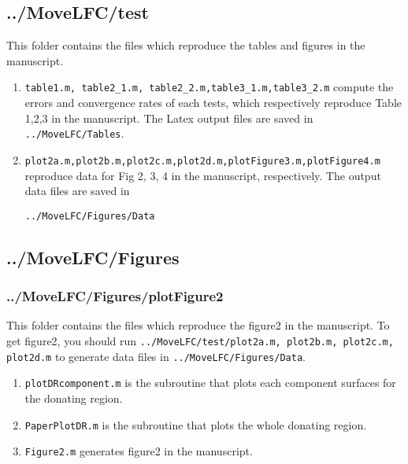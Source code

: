 \documentclass[twoside,a4paper]{article}
\begin{document}
\subsection{../MoveLFC/test}
This folder contains the files which reproduce the tables and figures in the manuscript.

\begin{enumerate}
\item \texttt{table1.m, table2\_1.m, table2\_2.m,table3\_1.m,table3\_2.m} compute the errors and convergence rates of each tests, which respectively reproduce Table 1,2,3 in the manuscript. The Latex output files are saved in \texttt{../MoveLFC/Tables}. 

\item \texttt{plot2a.m,plot2b.m,plot2c.m,plot2d.m,plotFigure3.m,plotFigure4.m}  reproduce data for Fig 2, 3, 4 in the manuscript, respectively. The output data files are saved in 

\texttt{../MoveLFC/Figures/Data}
\end{enumerate}
\subsection{../MoveLFC/Figures}
\subsubsection{../MoveLFC/Figures/plotFigure2}
This folder contains the files which reproduce the figure2 in the manuscript. To get figure2, you should run \texttt{../MoveLFC/test/plot2a.m, plot2b.m, plot2c.m, plot2d.m} to generate data files in \texttt{../MoveLFC/Figures/Data}.
\begin{enumerate}
    \item \texttt{plotDRcomponent.m} is the subroutine that plots each component surfaces for the donating region.
    \item \texttt{PaperPlotDR.m} is the subroutine that plots the whole donating region.
    \item \texttt{Figure2.m} generates figure2 in the manuscript.
\end{enumerate}
\end{document}
